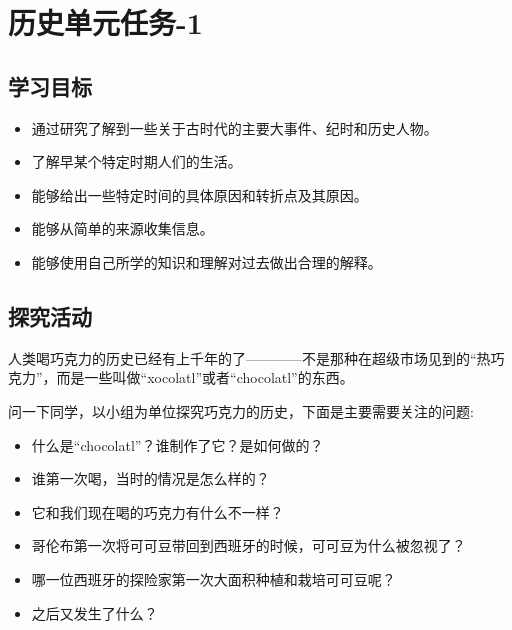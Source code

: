 \chapter{历史单元任务-1}

\section{学习目标}
     \begin{itemize}
       \item 通过研究了解到一些关于古时代的主要大事件、纪时和历史人物。
       \item 了解早某个特定时期人们的生活。 
       \item 能够给出一些特定时间的具体原因和转折点及其原因。
       \item 能够从简单的来源收集信息。
       \item 能够使用自己所学的知识和理解对过去做出合理的解释。
     \end{itemize}  


\section{探究活动}
   人类喝巧克力的历史已经有上千年的了————不是那种在超级市场见到的“热巧克力”，而是一些叫做“xocolatl”或者“chocolatl”的东西。\par
   问一下同学，以小组为单位探究巧克力的历史，下面是主要需要关注的问题:\par
   \begin{itemize}
      \item 什么是“chocolatl”？谁制作了它？是如何做的？
      \item 谁第一次喝，当时的情况是怎么样的？
      \item 它和我们现在喝的巧克力有什么不一样？
      \item 哥伦布第一次将可可豆带回到西班牙的时候，可可豆为什么被忽视了？
      \item 哪一位西班牙的探险家第一次大面积种植和栽培可可豆呢？  
      \item 之后又发生了什么？
   \end{itemize}  

